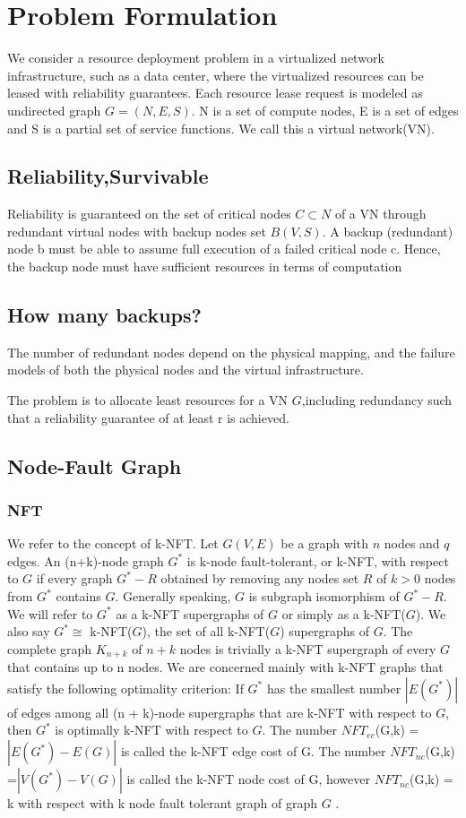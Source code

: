 
\section{Problem Formulation}
\label{sec:ProblemFormulation}

We consider a resource deployment problem in a virtualized network infrastructure, such as a data center, where the virtualized resources can be leased with reliability guarantees. Each resource lease request is modeled as undirected graph $G=(N,E,S)$. N is a set of compute nodes, E is a set of edges and S is a partial set of service functions. We call this a virtual network(VN).



\subsection{Reliability,Survivable}
Reliability is guaranteed on the set of critical nodes $C\subset N$ of a VN through redundant virtual nodes with backup nodes set $B(V,S)$. A backup (redundant) node b must be able to assume full execution of a failed critical node c. Hence, the backup node must have sufficient resources in terms of computation


\subsection{How many backups?}
The number of redundant nodes depend on the physical mapping, and the failure models of both the physical nodes and the virtual infrastructure.

The problem is to  allocate least resources for a VN $G$,including redundancy such that a reliability guarantee of at least r is achieved. 

\subsection{Node-Fault Graph}
\subsubsection{NFT}
We refer to the concept of k-NFT\cite{harary1996node}. Let $G(V,E)$ be a graph with $n$ nodes and $q$ edges. An
(n+k)-node graph $G^*$ is k-node fault-tolerant, or k-NFT, with respect to $G$ if every graph $G^*-R$ obtained by removing any nodes set $R$ of $k>0$ nodes from $G^*$ contains $G$. Generally speaking, $G$ is subgraph isomorphism of $G^*-R$. We will refer to $G^*$ as a k-NFT supergraphs of $G$ or simply as a k-NFT($G$). We also say $G^*\cong$ k-NFT($G$), the set of all k-NFT($G$) supergraphs of $G$. The complete graph $K_{n+k}$ of $n + k$ nodes is trivially a k-NFT supergraph of every $G$ that contains up to n nodes. We are concerned mainly with k-NFT graphs that satisfy the following optimality criterion: If $G^*$ has the smallest number $|E(G^*)|$ of edges among all (n + k)-node supergraphs that are k-NFT with respect to $G$, then $G^*$ is optimally k-NFT with respect to $G$. The number $NFT_{ec}$(G,k) =$|E(G^*)-E(G)|$ is called the k-NFT edge cost of G. The number $NFT_{nc}$(G,k) =$|V(G^*)-V(G)|$ is called the k-NFT node cost of G, however $NFT_{nc}$(G,k) = k with respect with k node fault tolerant graph of graph $G$ .
